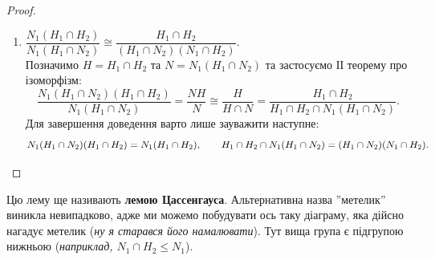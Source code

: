 \documentclass{math_library}
\begin{document}
\begin{proof}
\begin{enumerate}[wide=0pt,label={\Roman*.}]
\item $\dfrac{N_1 (H_1 \cap H_2)}{N_1(H_1 \cap N_2)} \cong \dfrac{H_1 \cap H_2}{(H_1 \cap N_2) (N_1 \cap H_2)}$.\\
Позначимо $H = H_1 \cap H_2$ та $N = N_1(H_1 \cap N_2)$ та застосуємо ІІ теорему про ізоморфізм:
\[
\dfrac{N_1(H_1 \cap N_2)(H_1 \cap H_2)}{N_1(H_1 \cap N_2)} = \dfrac{NH}{N} \cong \dfrac{H}{H \cap N} = \dfrac{H_1 \cap H_2}{H_1 \cap H_2 \cap N_1(H_1 \cap N_2)}.
\]
Для завершення доведення варто лише зауважити наступне:
\[
N_1 (H_1 \cap N_2)(H_1 \cap H_2) = N_1(H_1 \cap H_2), \qquad H_1 \cap H_2 \cap N_1(H_1 \cap N_2) = (H_1 \cap N_2)(N_1 \cap H_2). \qedhere
\]
\end{enumerate}
\end{proof}

\begin{remark}
Цю лему ще називають \textbf{лемою Цассенгауса}. Альтернативна назва ''метелик'' виникла невипадково, адже ми можемо побудувати ось таку діаграму, яка дійсно нагадує метелик (\textit{ну я старався його намалювати}). Тут вища група є підгрупою нижньою (\textit{наприклад, $N_1 \cap H_2 \leq N_1$}).
\begin{figure}[H]
\centering
{}
\end{figure}
\end{remark}
\end{document}
